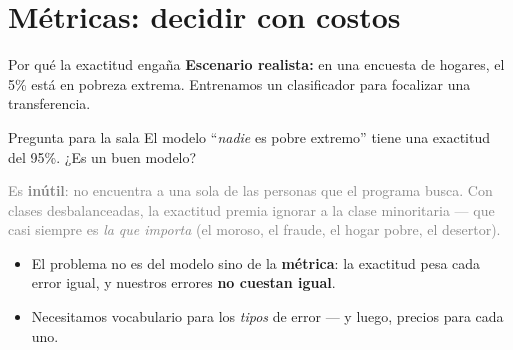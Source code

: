 \documentclass{beamer}
\newcommand{\1}{\mathbb{I}}
\begin{document}
\section{Métricas: decidir con costos}
\begin{frame}[noframenumbering]
\tableofcontents[currentsection]
\end{frame}

\begin{frame}{Por qué la exactitud engaña}
\small
\textbf{Escenario realista:} en una encuesta de hogares, el 5\% está en pobreza extrema. Entrenamos un clasificador para focalizar una transferencia.
\pause

\vspace{0.2cm}
\begin{block}{Pregunta para la sala}
El modelo ``\emph{nadie} es pobre extremo'' tiene una exactitud del 95\%. ¿Es un buen modelo?
\end{block}
\pause

\textcolor{gray}{Es \textbf{inútil}: no encuentra a una sola de las personas que el programa busca. Con clases desbalanceadas, la exactitud premia ignorar a la clase minoritaria --- que casi siempre es \emph{la que importa} (el moroso, el fraude, el hogar pobre, el desertor).}
\pause

\vspace{0.2cm}
\begin{itemize}\itemsep4pt
  \item El problema no es del modelo sino de la \textbf{métrica}: la exactitud pesa cada error igual, y nuestros errores \textbf{no cuestan igual}.
  \item Necesitamos vocabulario para los \emph{tipos} de error --- y luego, precios para cada uno.
\end{itemize}
\end{frame}
\end{document}
